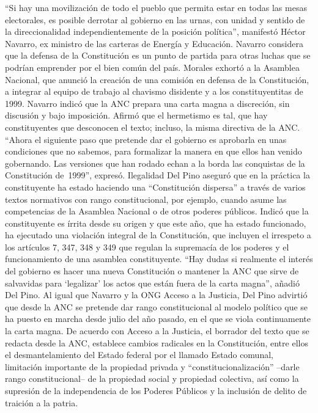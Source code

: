 \documentclass{article}%
\begin{document}
\newline%
%
“Si hay una movilización de todo el pueblo que permita estar en todas las mesas electorales, es posible derrotar al gobierno en las urnas, con unidad y sentido de la direccionalidad independientemente de la posición política”, manifestó Héctor Navarro, ex ministro de las carteras de Energía y Educación. Navarro considera que la defensa de la Constitución es un punto de partida para otras luchas que se podrían emprender por el bien común del país.%
\newline%
%
Morales exhortó a la Asamblea Nacional, que anunció la creación de una comisión en defensa de la Constitución, a integrar al equipo de trabajo al chavismo disidente y a los constituyentitas de 1999.%
\newline%
%
Navarro indicó que la ANC prepara una carta magna a discreción, sin discusión y bajo imposición. Afirmó que el hermetismo es tal, que hay constituyentes que desconocen el texto; incluso, la misma directiva de la ANC. “Ahora el siguiente paso que pretende dar el gobierno es aprobarla en unas condiciones que no sabemos, para formalizar la manera en que ellos han venido gobernando. Las versiones que han rodado echan a la borda las conquistas de la Constitución de~1999”, expresó.%
\newline%
%
Ilegalidad%
\newline%
%
Del Pino aseguró que en la práctica la constituyente ha estado haciendo una “Constitución dispersa” a través de varios textos normativos con rango constitucional, por ejemplo, cuando asume las competencias de la Asamblea Nacional o de otros poderes públicos.%
\newline%
%
Indicó que la constituyente es írrita desde su origen y que este año, que ha estado funcionado, ha ejecutado una violación integral de la Constitución, que incluyen el irrespeto a los artículos 7, 347, 348 y 349 que regulan la supremacía de los poderes y el funcionamiento de una asamblea constituyente.%
\newline%
%
“Hay dudas si realmente el interés del gobierno es hacer una nueva Constitución o mantener la ANC que sirve de salvavidas para ‘legalizar’ los actos que están fuera de la carta magna”, añadió Del Pino.%
\newline%
%
Al igual que Navarro y la ONG Acceso a la Justicia, Del Pino advirtió que desde la ANC se pretende dar rango constitucional al modelo político que se ha puesto en marcha desde julio del año pasado, en el que se viola continuamente la carta magna. De acuerdo con Acceso a la Justicia, el borrador del texto que se redacta desde la ANC, establece cambios radicales en la Constitución, entre ellos el desmantelamiento del Estado federal por el llamado Estado comunal, limitación importante de la propiedad privada y “constitucionalización” –darle rango constitucional– de la propiedad social y propiedad colectiva, así como la supresión de la independencia de los Poderes Públicos y la inclusión de delito de traición a la patria.%
\end{document}
